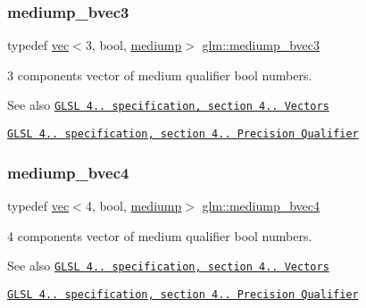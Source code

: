 \subsubsection{\texorpdfstring{mediump\+\_\+bvec3}{mediump\_bvec3}}
{\footnotesize\ttfamily typedef \mbox{\hyperlink{structglm_1_1vec}{vec}}$<$3, bool, \mbox{\hyperlink{namespaceglm_a36ed105b07c7746804d7fdc7cc90ff25a6416f3ea0c9025fb21ed50c4d6620482}{mediump}}$>$ \mbox{\hyperlink{group__core__precision_ga40b0d98c1fef52b1f6f6736c7223e317}{glm\+::mediump\+\_\+bvec3}}}

3 components vector of medium qualifier bool numbers.

\begin{DoxySeeAlso}{See also}
\href{http://www.opengl.org/registry/doc/GLSLangSpec.4.20.8.pdf}{\tt G\+L\+SL 4.. specification, section 4.. Vectors} 

\href{http://www.opengl.org/registry/doc/GLSLangSpec.4.20.8.pdf}{\tt G\+L\+SL 4.. specification, section 4.. Precision Qualifier} 
\end{DoxySeeAlso}
\mbox{\label{group__core__precision_ga064ca037c066a4d47ab6d34c2cf0ae2f}} 
\subsubsection{\texorpdfstring{mediump\+\_\+bvec4}{mediump\_bvec4}}
{\footnotesize\ttfamily typedef \mbox{\hyperlink{structglm_1_1vec}{vec}}$<$4, bool, \mbox{\hyperlink{namespaceglm_a36ed105b07c7746804d7fdc7cc90ff25a6416f3ea0c9025fb21ed50c4d6620482}{mediump}}$>$ \mbox{\hyperlink{group__core__precision_ga064ca037c066a4d47ab6d34c2cf0ae2f}{glm\+::mediump\+\_\+bvec4}}}

4 components vector of medium qualifier bool numbers.

\begin{DoxySeeAlso}{See also}
\href{http://www.opengl.org/registry/doc/GLSLangSpec.4.20.8.pdf}{\tt G\+L\+SL 4.. specification, section 4.. Vectors} 

\href{http://www.opengl.org/registry/doc/GLSLangSpec.4.20.8.pdf}{\tt G\+L\+SL 4.. specification, section 4.. Precision Qualifier} 
\end{DoxySeeAlso}
\mbox{\label{group__core__precision_gadbf2ed2cfb596bd2ca7e980777c0acde}} 
